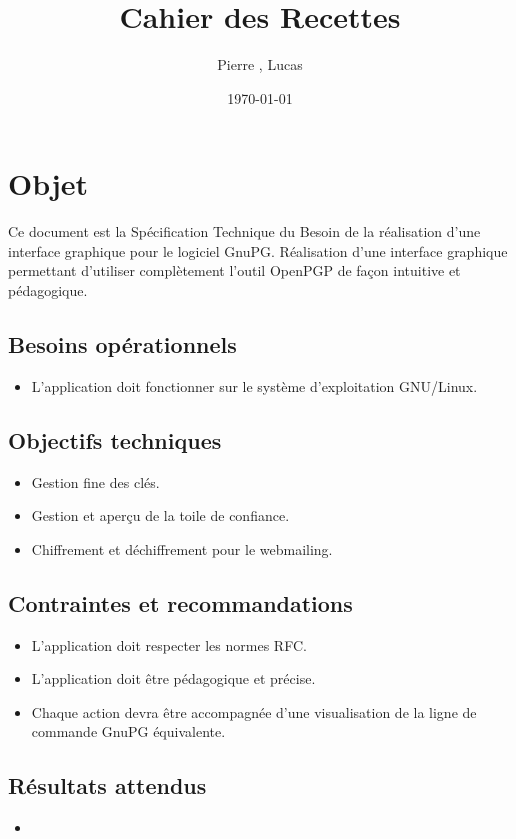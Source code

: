 \documentclass{../res/univ-projet}
\title{Cahier des Recettes}
\author{Pierre \bsc{Balmelle}, Lucas \bsc{Barbay}}
\date{\today}
\begin{document}
\maketitle
\newpage
\tableofcontents
\newpage

\section{Objet}

Ce document est la Spécification Technique du Besoin de la réalisation d'une interface graphique pour le logiciel GnuPG.
Réalisation d'une interface graphique permettant d'utiliser complètement l'outil OpenPGP
de façon intuitive et pédagogique.

\subsection{Besoins opérationnels}
\begin{itemize}
 \item L'application doit fonctionner sur le système d'exploitation GNU/Linux.
\end{itemize}

\subsection{Objectifs techniques}
\begin{itemize}
 \item Gestion fine des clés.
 \item Gestion et aperçu de la toile de confiance.
 \item Chiffrement et déchiffrement pour le webmailing.
\end{itemize}

\subsection{Contraintes et recommandations}
\begin{itemize}
 \item L'application doit respecter les normes RFC.
 \item L'application doit être pédagogique et précise.
 \item Chaque action devra être accompagnée d'une visualisation de la ligne de commande GnuPG équivalente.
\end{itemize}

\subsection{Résultats attendus}
\begin{itemize}
 \item 
\end{itemize}
\end{document}
